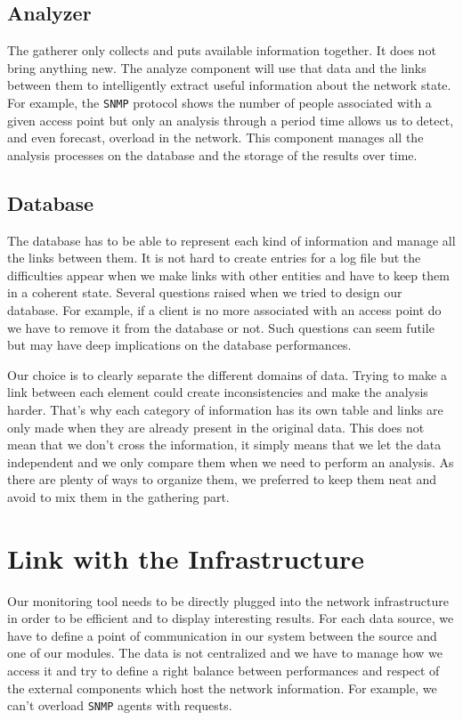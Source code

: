 \subsection{Analyzer}
The gatherer only collects and puts available information together. It does not bring anything new. The analyze component will use that data and the links between them to intelligently extract useful information about the network state. For example, the \texttt{SNMP} protocol shows the number of people associated with a given access point but only an analysis through a period time allows us to detect, and even forecast, overload in the network. This component manages all the analysis processes on the database and the storage of the results over time.


\subsection{Database}
The database has to be able to represent each kind of information and manage all the links between them. It is not hard to create entries for a log file but the difficulties appear when we make links with other entities and have to keep them in a coherent state. Several questions raised when we tried to design our database. For example, if a client is no more associated with an access point do we have to remove it from the database or not. Such questions can seem futile but may have deep implications on the database performances. 

Our choice is to clearly separate the different domains of data. Trying to make a link between each element could create inconsistencies and make the analysis harder. That's why each category of information has its own table and links are only made when they are already present in the original data. This does not mean that we don't cross the information, it simply means that we let the data independent and we only compare them when we need to perform an analysis. As there are plenty of ways to organize them, we preferred to keep them neat and avoid to mix them in the gathering part.


\section{Link with the Infrastructure}
Our monitoring tool needs to be directly plugged into the network infrastructure in order to be efficient and to display interesting results. For each data source, we have to define a point of communication in our system between the source and one of our modules. The data is not centralized and we have to manage how we access it and try to define a right balance between performances and respect of the external components which host the network information. For example, we can't overload \texttt{SNMP} agents with requests.

